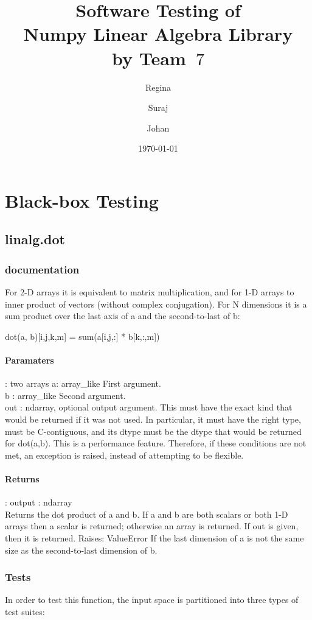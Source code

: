 \documentclass[a4paper,11pt]{article}
\title{\textbf{Software Testing of \\ Numpy Linear Algebra Library\\
        by Team~$7$                                   %
}
}
\author{Regina \and Suraj \and Johan}  %
\date{\today}
\begin{document}
	
	
\section{Black-box Testing}
\subsection{linalg.dot}
\subsubsection{documentation}
For 2-D arrays it is equivalent to matrix multiplication, and for 1-D arrays to inner product of vectors (without complex conjugation). For N dimensions it is a sum product over the last axis of a and the second-to-last of b:

    dot(a, b)[i,j,k,m] = sum(a[i,j,:] * b[k,:,m])
   \paragraph{Paramaters}: two arrays a: array\_like First argument.\\
b : array\_like Second argument.\\
out : ndarray, optional output argument. This must have the exact kind that would be returned if it was not used. In particular, it must have the right type, must be C-contiguous, and its dtype must be the dtype that would be returned for dot(a,b). This is a performance feature. Therefore, if these conditions are not met, an exception is raised, instead of attempting to be flexible.
    \paragraph{Returns}:    output : ndarray\\
Returns the dot product of a and b. If a and b are both scalars or both 1-D arrays then a scalar is returned; otherwise an array is returned. If out is given, then it is returned.
Raises: 
ValueError
If the last dimension of a is not the same size as the second-to-last dimension of b.


\subsubsection{Tests}
In order to test this function, the input space is partitioned into three types of test suites:
\end{document}
